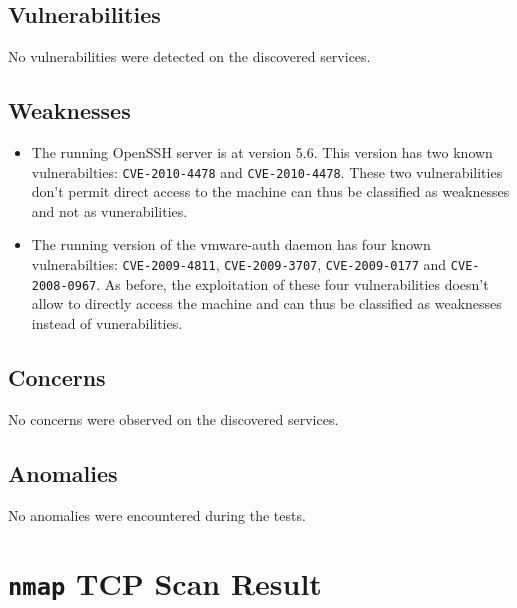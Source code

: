 \documentclass[10pt,a4paper,twoside,onecolumn]{article}
\begin{document}
\subsection{Vulnerabilities}

No vulnerabilities were detected on the discovered services.

\subsection{Weaknesses}

\begin{itemize}
	\item The running OpenSSH server is at version 5.6. This version has two known vulnerabilties: \texttt{CVE-2010-4478} and \texttt{CVE-2010-4478}. These two vulnerabilities don't permit direct access to the machine can thus be classified as weaknesses and not as vunerabilities.
	\item The running version of the vmware-auth daemon has four known vulnerabilties: \texttt{CVE-2009-4811}, \texttt{CVE-2009-3707}, \texttt{CVE-2009-0177} and \texttt{CVE-2008-0967}. As before, the exploitation of these four vulnerabilities doesn't allow to directly access the machine and can thus be classified as weaknesses instead of vunerabilities.

\end{itemize}

\subsection{Concerns}

No concerns were observed on the discovered services.

\subsection{Anomalies}

No anomalies were encountered during the tests.


\appendix

\clearpage
\section{\texttt{nmap} TCP Scan Result}
\label{sec:tcp-scan}
\end{document}
